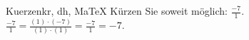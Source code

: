 \begin{MAufgabe}{Kuerzen}{kr, dh, MaTeX}
K\"urzen Sie soweit m\"oglich: $\frac{-7}{1}$.\\ 
\ifLsg\MLoesung
\quad $\frac{-7}{1}=\frac{(1)\cdot(-7)}{(1)\cdot(1)}=\frac{-7}{1}=-7$.\else\relax\fi
 \end{MAufgabe}